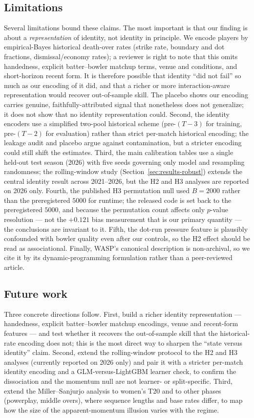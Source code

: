 \subsection{Limitations}
\label{sec:limitations}
Several limitations bound these claims. The most important is that our finding is
about a \emph{representation} of identity, not identity in principle. We encode
players by empirical-Bayes historical death-over rates (strike rate, boundary and
dot fractions, dismissal/economy rates); a reviewer is right to note that this omits
handedness, explicit batter--bowler matchup terms, venue and conditions, and
short-horizon recent form. It is therefore possible that identity ``did not fail''
so much as our encoding of it did, and that a richer or more interaction-aware
representation would recover out-of-sample skill. The placebo shows our encoding
carries genuine, faithfully-attributed signal that nonetheless does not generalize;
it does not show that no identity representation could. Second, the identity encoders
use a simplified two-pool historical scheme (pre-$(T{-}3)$ for training,
pre-$(T{-}2)$ for evaluation) rather than strict per-match historical encoding; the
leakage audit and placebo argue against contamination, but a stricter encoding could
still shift the estimates. Third, the main calibration tables use a single held-out
test season (2026) with five seeds governing only model and resampling randomness;
the rolling-window study (Section~\ref{sec:results-robust}) extends the central
identity result across 2021--2026, but the H2 and H3 analyses are reported on 2026
only. Fourth, the published H3 permutation null used $B = 2000$ rather than the
preregistered $5000$ for runtime; the released code is set back to the
preregistered $5000$, and because the permutation count affects only $p$-value
resolution --- not the $+0.121$ bias measurement that is our primary quantity ---
the conclusions are invariant to it. Fifth, the dot-run pressure
feature is plausibly confounded with bowler quality even after our controls, so the
H2 effect should be read as associational. Finally, WASP's canonical description is
non-archival, so we cite it by its dynamic-programming formulation rather than a
peer-reviewed article.

\subsection{Future work}
Three concrete directions follow. First, build a richer identity representation ---
handedness, explicit batter--bowler matchup encodings, venue and recent-form
features --- and test whether it recovers the out-of-sample skill that the
historical-rate encoding does not; this is the most direct way to sharpen the
``state versus identity'' claim. Second, extend the rolling-window protocol to the
H2 and H3 analyses (currently reported on 2026 only) and pair it with a stricter
per-match identity encoding and a GLM-versus-LightGBM learner check, to confirm the
dissociation and the momentum null are not learner- or split-specific. Third, extend
the Miller--Sanjurjo analysis to women's T20 and to other phases (powerplay, middle
overs), where sequence lengths and base rates differ, to map how the size of the
apparent-momentum illusion varies with the regime.
